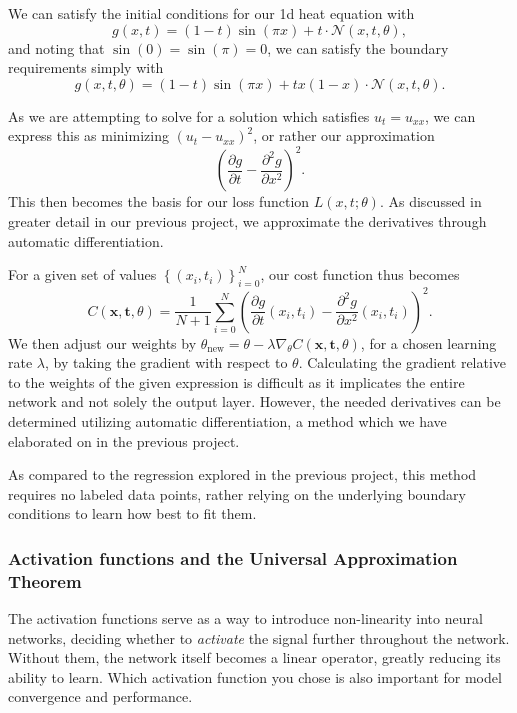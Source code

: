 \documentclass{article}
\theoremstyle{definition}
\begin{document}
We can satisfy the initial conditions for our 1d heat equation with
\begin{equation*}
    g(x, t) = (1 - t) \sin(\pi x) + t \cdot \mathcal{N}(x, t, \theta),
\end{equation*}
and noting that $\sin(0) = \sin(\pi) = 0$, we can satisfy the boundary requirements simply with
\begin{equation*}
    g(x, t, \theta) = (1 - t) \sin(\pi x) + tx (1 - x) \cdot \mathcal{N}(x, t, \theta).
\end{equation*}

As we are attempting to solve for a solution which satisfies $u_t = u_{xx}$, we can express this as minimizing $\left(u_t - u_{xx}\right)^2$, or rather our approximation
\begin{equation*}
    \left( \frac{\partial g}{\partial t} - \frac{\partial^2 g}{\partial x^2} \right)^2.
\end{equation*}
This then becomes the basis for our loss function $L(x, t; \theta)$. As discussed in greater detail in our previous project, we approximate the derivatives through automatic differentiation.

For a given set of values $\left\{ (x_i, t_i) \right\}_{i=0}^{N}$, our cost function thus becomes
\begin{equation*}
    C(\boldsymbol{x}, \boldsymbol{t}, \theta) = \frac{1}{N + 1} \sum_{i=0}^N \left( \frac{\partial g}{\partial t}(x_i, t_i) - \frac{\partial^2 g}{\partial x^2}(x_i, t_i) \right)^2.
\end{equation*}
We then adjust our weights by $\theta_\text{new} = \theta - \lambda \nabla_\theta C(\boldsymbol{x}, \boldsymbol{t}, \theta)$, for a chosen learning rate $\lambda$, by taking the gradient with respect to $\theta$. Calculating the gradient relative to the weights of the given expression is difficult as it implicates the entire network and not solely the output layer. However, the needed derivatives can be determined utilizing automatic differentiation, a method which we have elaborated on in the previous project.

As compared to the regression explored in the previous project, this method requires no labeled data points, rather relying on the underlying boundary conditions to learn how best to fit them.

\subsubsection{Activation functions and the Universal Approximation Theorem}
The activation functions serve as a way to introduce non-linearity into neural networks, deciding whether to \textit{activate} the signal further throughout the network. Without them, the network itself becomes a linear operator, greatly reducing its ability to learn. Which  activation function you chose is also important for model convergence and performance.
\end{document}
